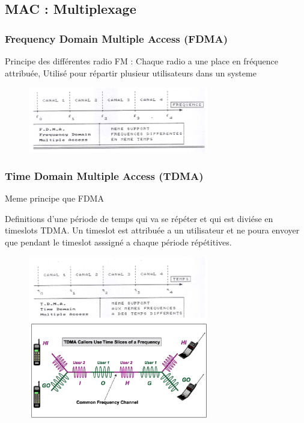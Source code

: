 \documentclass[12pt]{article}
\begin{document}
	\subsection{MAC : Multiplexage}
		\subsubsection{Frequency Domain Multiple Access (FDMA)}

			Principe des différentes radio FM : Chaque radio a une place en fréquence attribuée, Utilisé pour répartir plusieur utilisateurs dans un systeme
			\begin{figure}[htp]
				\centering
				\includegraphics[width=0.7\textwidth]{img/FDMA.png}
			\end{figure}
		
		\subsubsection{Time Domain Multiple Access (TDMA)}
			Meme principe que FDMA
			
			Definitions d'une période de temps qui va se répéter et  qui est diviése en timeslots TDMA. Un timeslot est attribuée a un utilisateur et ne poura envoyer que pendant le timeslot asssigné a chaque période répétitives.
			
			\begin{figure}[htp]
				\centering
				\includegraphics[width=0.7\textwidth]{img/TDMA.png}
				\includegraphics[width=0.7\textwidth]{img/TDMA1.png}
			\end{figure}
\end{document}
